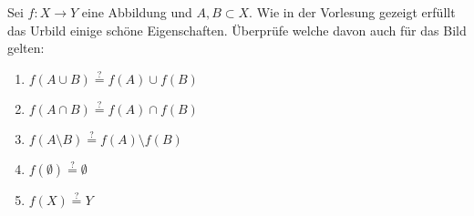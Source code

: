 \begin{exercise}
  Sei $f \colon  X \to Y$ eine Abbildung und $A,B \subset X$. Wie in
  der Vorlesung gezeigt erfüllt das Urbild einige schöne Eigenschaften.
  Überprüfe welche davon auch für das Bild gelten:
  \begin{enumerate}
  \item $f(A\cup B) \overset{ ? }{ = } f(A) \cup f(B)$
  \item $f(A\cap B) \overset{ ? }{ = } f(A) \cap f(B)$
  \item $f(A\setminus B) \overset{ ? }{ = } f(A) \setminus f(B)$
  \item $f(\emptyset) \overset{ ? }{ = } \emptyset$
  \item $f(X) \overset{ ? }{ = } Y$
  \end{enumerate}
\end{exercise}
